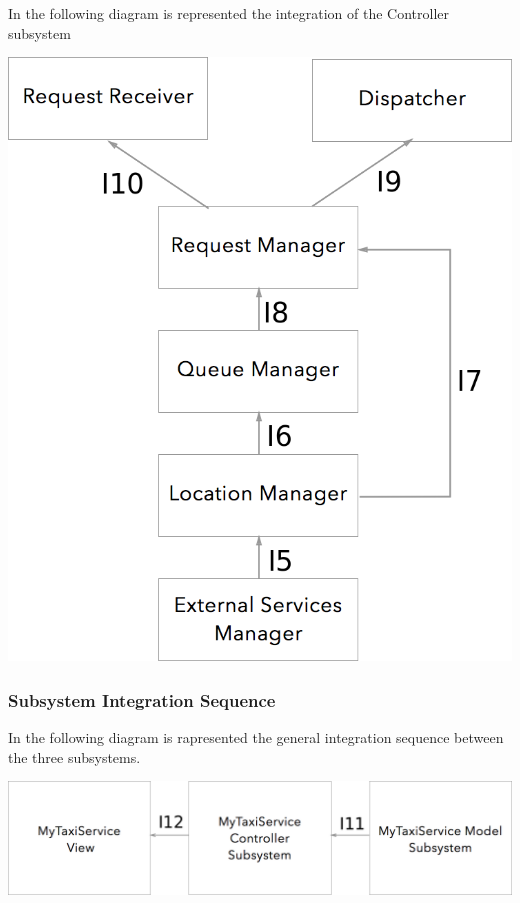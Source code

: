 \documentclass[11pt,titlepage]{article} %
\begin{document}
\newpage

     \noindent In the following diagram is represented the integration of the Controller subsystem\newline
    \begin{center}
      \includegraphics[scale=0.3]{Integration-2.png}
    \end{center}
  \subsubsection{Subsystem Integration Sequence}
    In the following diagram is rapresented the general integration sequence between the three subsystems.
    \newline
    \begin{center}
      \includegraphics[scale=0.3]{Integration-3.png}
    \end{center}
\end{document}
